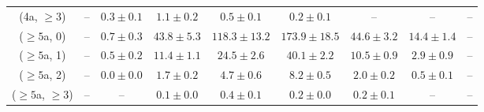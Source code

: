\begin{table}[h!]
{\begin{tabular}{ccccccccc}
	(4a, $\ge3$) & -- & $0.3\pm 0.1$ & $1.1\pm 0.2$ & $0.5\pm 0.1$ & $0.2\pm 0.1$ & -- & -- & -- \\[0.5ex] 
	($\ge5$a, 0) & -- & $0.7\pm 0.3$ & $43.8\pm 5.3$ & $118.3\pm 13.2$ & $173.9\pm 18.5$ & $44.6\pm 3.2$ & $14.4\pm 1.4$ & -- \\[0.5ex] 
	($\ge5$a, 1) & -- & $0.5\pm 0.2$ & $11.4\pm 1.1$ & $24.5\pm 2.6$ & $40.1\pm 2.2$ & $10.5\pm 0.9$ & $2.9\pm 0.9$ & -- \\[0.5ex] 
	($\ge5$a, 2) & -- & $0.0\pm 0.0$ & $1.7\pm 0.2$ & $4.7\pm 0.6$ & $8.2\pm 0.5$ & $2.0\pm 0.2$ & $0.5\pm 0.1$ & -- \\[0.5ex] 
	($\ge5$a, $\ge3$) & -- & -- & $0.1\pm 0.0$ & $0.4\pm 0.1$ & $0.2\pm 0.0$ & $0.2\pm 0.1$ & -- & -- \\[0.5ex] 
	\hline
	\hline
\end{tabular}}
\end{table}
